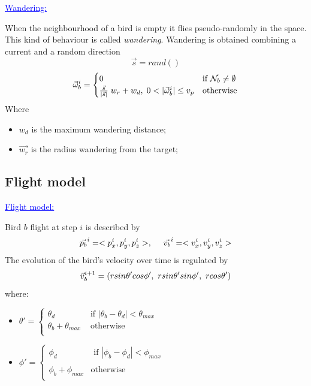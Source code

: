 \documentclass{beamer}
\begin{document}
\begin{frame}
\textcolor{blue}{\underline{Wandering:}}

When the neighbourhood  of a bird is empty it flies pseudo-randomly in the space. This kind of behaviour is called \textit{wandering}. 
Wandering is obtained combining a current and a random direction 
\[
\vec{s} = rand()
\]
\begin{equation}
    \vec{\omega}_b^i =  
		\begin{cases} 
			0 & \mbox{if } \mathcal{N}_b \neq \emptyset \\ 
			\frac{\vec{s}}{|\vec{s}|}\;w_r+w_d,\; 0 < |\vec{\omega}_b^i| \leq v_p &  \mbox{otherwise}  \notag
		\end{cases}
\end{equation}
Where 
\begin{itemize}
\item $w_d$ is the maximum wandering distance;
\item $\vec{w_r}$ is the radius wandering from the target;
\end{itemize}

\end{frame}

\subsection{Flight model}
\begin{frame}
\textcolor{blue}{\underline{Flight model:}}

Bird $b$ flight at step $i$ is described by 
\begin{equation}
\vec{ p_b}^i = < p_x^i , p_y^i , p_z^i >, \ \ \ \ \vec{v_b}^i = < v_x^i , v_y^i , v_z^i > \notag
\end{equation}
The evolution of the bird's velocity over time is regulated
by 
\begin{equation}
\vec{v}_b^{i+1} = (r sin\theta' cos \phi', \ r sin\theta' sin \phi', \ r cos \theta') \notag
\end{equation}
where:
\begin{itemize}
  \item $
     \theta' = \begin{cases}
    \theta_d &\mbox{ if }  |\theta_b - \theta_d| < \theta_{max}\\
    \theta_b + \theta_{max} &\mbox{ otherwise }\\
    \end{cases}
  $ \hfill \\
  \medskip
    \item $
     \phi' = \begin{cases}
    \phi_d &\mbox{ if }  |\phi_b - \phi_d| < \phi_{max}\\
     \\
    \phi_b + \phi_{max} &\mbox{otherwise}\\
    \end{cases}
  $ \hfill \\ 
\end{itemize}
\end{frame}
   
\end{document}
